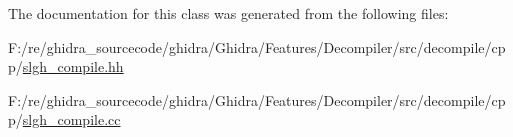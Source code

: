 The documentation for this class was generated from the following files\+:\begin{DoxyCompactItemize}
\item 
F\+:/re/ghidra\+\_\+sourcecode/ghidra/\+Ghidra/\+Features/\+Decompiler/src/decompile/cpp/\mbox{\hyperlink{slgh__compile_8hh}{slgh\+\_\+compile.\+hh}}\item 
F\+:/re/ghidra\+\_\+sourcecode/ghidra/\+Ghidra/\+Features/\+Decompiler/src/decompile/cpp/\mbox{\hyperlink{slgh__compile_8cc}{slgh\+\_\+compile.\+cc}}\end{DoxyCompactItemize}
